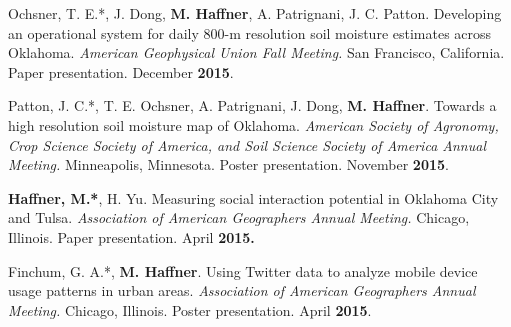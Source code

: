\begin{cventries}
   \cventry
      {}
      {}
      {}
      {}
      {
        \begin{cvitems}
          \vspace{-2mm}
        \item {Ochsner, T. E.*, J. Dong, \textbf{M. Haffner}, A. Patrignani, J.
            C. Patton. Developing an operational system for daily 800-m
            resolution soil moisture estimates across Oklahoma. \textit{American
              Geophysical Union Fall Meeting.} San Francisco, California. Paper
            presentation. December \textbf{2015}.}
            \end{cvitems}
            }

   \cventry
      {}
      {}
      {}
      {}
      {
        \begin{cvitems}
          \vspace{-2mm}
        \item {Patton, J. C.*, T. E. Ochsner, A. Patrignani, J. Dong, \textbf{M.
              Haffner}. Towards a high resolution soil moisture map of Oklahoma.
            \textit{American Society of Agronomy, Crop Science Society of
              America, and Soil Science Society of America Annual Meeting.}
            Minneapolis, Minnesota. Poster presentation. November
            \textbf{2015}.}
            \end{cvitems}
            }

   \cventry
      {}
      {}
      {}
      {}
      {
        \begin{cvitems}
          \vspace{-2mm}
        \item {\textbf{Haffner, M.*}, H. Yu. Measuring social interaction
            potential in Oklahoma City and Tulsa. \textit{Association of
              American Geographers Annual Meeting.} Chicago, Illinois. Paper
            presentation. April \textbf{2015.}}
              \end{cvitems}
              }

   \cventry
      {}
      {}
      {}
      {}
      {
        \begin{cvitems}
          \vspace{-2mm}
        \item {Finchum, G. A.*, \textbf{M. Haffner}. Using Twitter data to
            analyze mobile device usage patterns in urban areas.
            \textit{Association of American Geographers Annual Meeting.}
            Chicago, Illinois. Poster presentation. April \textbf{2015}.}
              \end{cvitems}
            }


\end{cventries}
